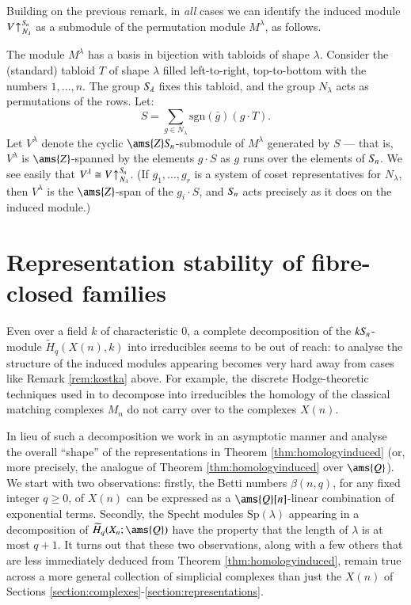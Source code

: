 \documentclass[matann2]{svjour1}
\def\Z{\ams{Z}}
\def\Q{\ams{Q}}
\def\symn{S_{\kern-1pt n}}
\def\sgn{\mathrm{sgn}}
\def\Sp{\mathrm{Sp}}
\newcommand{\Sym}[1]{S_{\kern-1pt {#1}}}
\begin{document}
\begin{remark}
Building on the previous remark, in \emph{all} cases we can 
identify the induced module
$V\kern1pt{\uparrow^{\kern1pt\Sym{n}}_{\kern1ptN_\lambda}}$ 
as a submodule of the permutation module $M^\lambda$, as follows.

The module $M^\lambda$ has a basis in bijection with tabloids of 
shape $\lambda$. 
Consider the (standard) tabloid $T$ of shape $\lambda$ filled 
left-to-right, top-to-bottom with the numbers $1,\ldots,n$.
The group $\Sym{\lambda}$ fixes this tabloid, and the group 
$N_\lambda$ acts as permutations of the rows.
Let:
$$
S = \sum_{g\in N_\lambda} \sgn(\bar{g}) (g\cdot T).
$$
Let $V^\lambda$ denote the cyclic $\Z\symn$-submodule of $M^\lambda$ 
generated by $S$ --- that is, $V^\lambda$ is $\Z$-spanned by the 
elements $g\cdot S$ as $g$ runs over the elements of $\symn$.
We see easily that
$V^\lambda \cong V\kern1pt{\uparrow^{\kern1pt\Sym{n}}_{\kern1ptN_\lambda}}$.
(If $g_1,\ldots,g_r$ is a system of coset representatives for $N_\lambda$, 
then $V^\lambda$ is the $\Z$-span of the $g_i\cdot S$, and 
$\symn$ acts precisely as it does on the induced module.)
\end{remark}

\section{Representation stability of fibre-closed families}

Even over a field $k$ of characteristic $0$, a complete decomposition of the 
$k\symn$-module $\widetilde{H}_q(X(n),k)$
into irreducibles 
seems to be out of reach: to analyse the structure of the 
induced modules appearing becomes very hard away from cases
like Remark \ref{rem:kostka} above. For example, the discrete Hodge-theoretic
techniques used in
\cites{MR1912799,MR1648484}
to decompose into irreducibles
the homology
of the classical matching complexes $M_n$ do not carry over to the
complexes $X(n)$.

In lieu of such a decomposition we work in an asymptotic manner
and analyse the overall ``shape'' of the representations in
Theorem \ref{thm:homologyinduced} (or, more precisely, the analogue of Theorem 
\ref{thm:homologyinduced} over $\Q$). We start with two observations:
firstly, the Betti numbers $\beta(n,q)$, for any fixed integer
$q \geq 0$, of $X(n)$ can be expressed
as a $\Q[n]$-linear combination of exponential terms.
Secondly, the Specht modules $\Sp(\lambda)$
appearing in a decomposition of
$\widetilde{H}_q(X_n;\Q)$ have the property that the length 
of $\lambda$ is at most
$q+1$. It turns out that these two
observations, along with a few others that are less
immediately deduced from Theorem \ref{thm:homologyinduced},
remain true across a more general collection of simplicial complexes
than just the $X(n)$ of Sections
\ref{section:complexes}-\ref{section:representations}.
\end{document}
